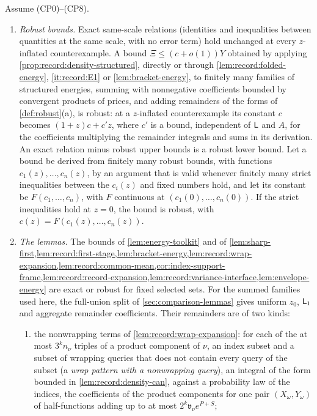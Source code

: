 \begin{lemma}\label{lem:record:rec}
Assume (CP0)--(CP8).
\begin{enumerate}[label=(\roman*)]
\item\emph{Robust bounds.} Exact same-scale relations (identities and
 inequalities between quantities at the same scale, with no error term) hold
 unchanged at every $z$-inflated counterexample. A bound $\Xi\le(c+o(1))Y$ obtained by applying \cref{prop:record:density-structured}, directly or
 through \cref{lem:record:folded-energy}, \ref{it:record:E1} or
 \cref{lem:bracket-energy}, to finitely many families of structured
 energies, summing with nonnegative coefficients bounded by convergent
 products of prices, and adding remainders of the forms of
 \cref{def:robust}(a), is robust: at a $z$-inflated counterexample its
 constant $c$ becomes $(1+z)c+c'z$, where $c'$ is a bound, independent of $\mathsf L$ and $A$, for the coefficients multiplying the remainder integrals and sums in its derivation. An exact relation minus robust upper bounds is a robust lower
 bound. Let a bound be derived from finitely many robust bounds, with
 functions $c_1(z),\dots,c_n(z)$, by an argument that is valid whenever
 finitely many strict inequalities between the $c_i(z)$ and fixed numbers
 hold, and let its constant be $F(c_1,\dots,c_n)$, with $F$ continuous at
 $(c_1(0),\dots,c_n(0))$. If the strict inequalities hold at $z=0$, the bound
 is robust, with $c(z)=F(c_1(z),\dots,c_n(z))$.
\item\emph{The lemmas.} The bounds of \cref{lem:energy-toolkit} and of
 \cref{lem:sharp-first,lem:record:first-stage,lem:bracket-energy,lem:record:wrap-expansion,lem:record:common-mean,cor:index-support-frame,lem:record:record-expansion,lem:record:variance-interface,lem:envelope-energy}
 are exact or robust for fixed selected sets. For the summed families used
 here, the full-union split of \cref{sec:comparison-lemmas} gives uniform
 $z_0$, $\mathsf L_1$ and aggregate remainder coefficients. Their remainders
 are of two kinds:
 \begin{enumerate}[label=(\alph*)]
 \item the nonwrapping terms of \cref{lem:record:wrap-expansion}: for each of
  the at most $3^kn_\nu$ triples of a product component of $\nu$, an index
  subset and a subset of wrapping queries that does not contain every query of the subset (a \emph{wrap pattern with a nonwrapping query}), an integral of the form
  bounded in \cref{lem:record:density-can}, against a probability law of the
  indices, the coefficients of the product components for one pair $(X_\omega,Y_\omega)$ of half-functions adding up to at most $2^k\mathfrak v_\nu e^{P+S}$;

\end{enumerate}
\end{enumerate}
\end{lemma}
